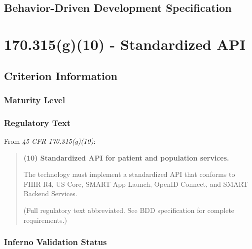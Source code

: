 \section{Behavior-Driven Development Specification}




\chapter{\textsection{} 170.315(g)(10) - Standardized API}
\label{chap:g10}


\section{Criterion Information}

\subsection{Maturity Level}

\subsection{Regulatory Text}

From \textit{45 CFR \textsection{} 170.315(g)(10)}:

\begin{quotation}
\textbf{(10) Standardized API for patient and population services.}

The technology must implement a standardized API that conforms to FHIR R4, US Core, SMART App Launch, OpenID Connect, and SMART Backend Services.

(Full regulatory text abbreviated. See BDD specification for complete requirements.)
\end{quotation}

\subsection{Inferno Validation Status}

